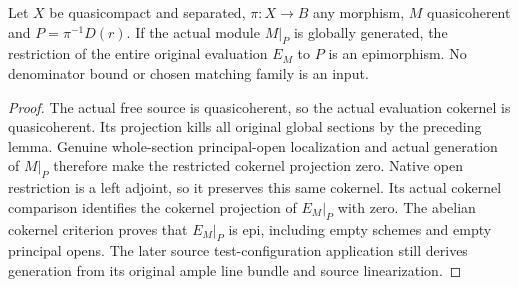 \begin{proposition}
\label{prop:scheme-module-original-evaluation-principal-epi}
\leanok
{}
Let $X$ be quasicompact and separated, $\pi:X\to B$ any morphism,
$M$ quasicoherent and $P=\pi^{-1}D(r)$. If the actual module
$M|_P$ is globally generated, the restriction of the entire
original evaluation $E_M$ to $P$ is an epimorphism.
No denominator bound or chosen matching family is an input.
\end{proposition}
\begin{proof}
The actual free source is quasicoherent, so the actual evaluation
cokernel is quasicoherent. Its projection kills all original
global sections by the preceding lemma. Genuine whole-section
principal-open localization and actual generation of $M|_P$
therefore make the restricted cokernel projection zero.
Native open restriction is a left adjoint, so it preserves
this same cokernel. Its actual cokernel comparison identifies
the cokernel projection of $E_M|_P$ with zero. The abelian
cokernel criterion proves that $E_M|_P$ is epi, including empty
schemes and empty principal opens. The later source test-configuration
application still derives generation from its original ample
line bundle and source linearization.
\end{proof}
